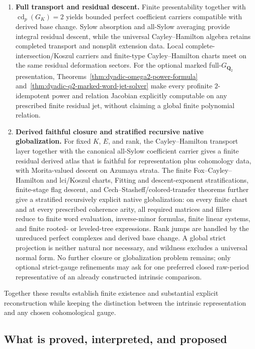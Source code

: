 \documentclass[11pt]{article}
\theoremstyle{definition}
\begin{document}
\begin{enumerate}[label=\textbf{(\arabic*)}]
\item \textbf{Full transport and residual descent.}
Finite presentability together with $\operatorname{cd}_p(G_K)=2$ yields bounded perfect coefficient carriers compatible with derived base change.  Sylow absorption and all-Sylow averaging provide integral residual descent, while the universal Cayley--Hamilton algebra retains completed transport and nonsplit extension data.  Local complete-intersection/Koszul carriers and finite-type Cayley--Hamilton charts meet on the same residual deformation sectors.  For the optional marked full-$G_{\mathbf Q_2}$ presentation, Theorems~\ref{thm:dyadic-omega2-power-formula} and~\ref{thm:dyadic-q2-marked-word-jet-solver} make every profinite $2$-idempotent power and relation Jacobian explicitly computable on any prescribed finite residual jet, without claiming a global finite polynomial relation.

\item \textbf{Derived faithful closure and stratified recursive native globalization.}
For fixed $K$, $E$, and rank, the Cayley--Hamilton transport layer together with the canonical all-Sylow coefficient carrier gives a finite residual derived atlas that is faithful for representation plus cohomology data, with Morita-valued descent on Azumaya strata.  The finite Fox--Cayley--Hamilton and lci/Koszul charts, Fitting and descent-exponent stratifications, finite-stage flag descent, and Cech--Stasheff/colored-transfer theorems further give a stratified recursively explicit native globalization: on every finite chart and at every prescribed coherence arity, all required matrices and fillers reduce to finite word evaluation, inverse-minor formulas, finite linear systems, and finite rooted- or leveled-tree expressions.  Rank jumps are handled by the unreduced perfect complexes and derived base change.  A global strict projection is neither natural nor necessary, and wildness excludes a universal normal form.  No further closure or globalization problem remains; only optional strict-gauge refinements may ask for one preferred closed raw-period representative of an already constructed intrinsic comparison.
\end{enumerate}

Together these results establish finite existence and substantial explicit reconstruction while keeping the distinction between the intrinsic representation and any chosen cohomological gauge.

\subsection{What is proved, interpreted, and proposed}
\end{document}
